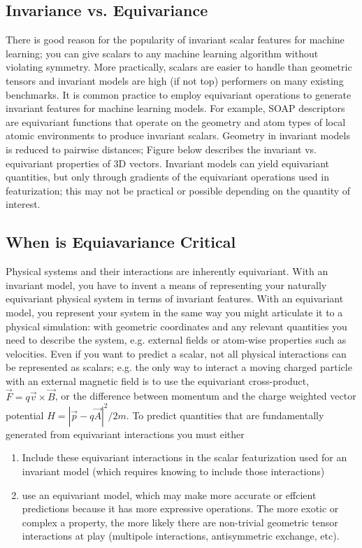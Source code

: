 \documentclass[book.tex]{subfiles}
\begin{document}
\subsection{Invariance vs. Equivariance}

There is good reason for the popularity of invariant scalar features for machine learning; you can give scalars
to any machine learning algorithm without violating symmetry. More practically, scalars are easier to handle than geometric tensors and invariant models are high (if not top) performers on many existing benchmarks. It is common practice to employ equivariant operations to generate invariant features for machine learning models. For example, SOAP descriptors are equivariant functions that operate on the geometry and atom types of local atomic environments to produce invariant scalars. Geometry in invariant models is reduced to pairwise distances; Figure below describes the invariant vs. equivariant properties of 3D vectors. Invariant models can yield equivariant quantities, but only through gradients of the equivariant operations used in featurization; this may not be practical or possible depending on the quantity of interest.

\subsection{When is Equiavariance Critical}
Physical systems and their interactions are inherently equivariant. With an invariant model, you have to invent a means of representing your naturally equivariant physical system in terms of invariant features. With an equivariant model, you represent your system in the same way you might articulate it to a physical simulation: with geometric coordinates and any relevant quantities you need to describe the system, e.g. external fields or atom-wise properties such as velocities. Even if you want to predict a scalar, not all physical interactions can be represented as scalars; e.g. the only way to interact a moving charged particle with an external magnetic field is to use the equivariant cross-product,$\vec{F}=q\vec{v}\times \vec{B}$, or the difference between momentum and the charge weighted vector potential $H=|\vec{p}-q\vec{A}|^2/2m$.
To predict quantities that are fundamentally generated from equivariant interactions you must either 

\begin{enumerate}
    \item Include these equivariant interactions in the scalar featurization used for an invariant model (which requires knowing to include those interactions) 
    \item use an equivariant model, which may make more accurate or effcient predictions because it has more expressive operations. The more exotic or complex a property, the more likely there are non-trivial geometric tensor interactions at play (multipole interactions, antisymmetric exchange, etc).
\end{enumerate}
\end{document}
